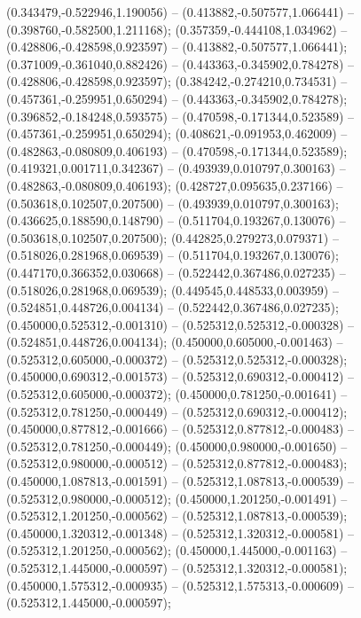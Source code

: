  (0.343479,-0.522946,1.190056) -- (0.413882,-0.507577,1.066441) -- (0.398760,-0.582500,1.211168);
 (0.357359,-0.444108,1.034962) -- (0.428806,-0.428598,0.923597) -- (0.413882,-0.507577,1.066441);
 (0.371009,-0.361040,0.882426) -- (0.443363,-0.345902,0.784278) -- (0.428806,-0.428598,0.923597);
 (0.384242,-0.274210,0.734531) -- (0.457361,-0.259951,0.650294) -- (0.443363,-0.345902,0.784278);
 (0.396852,-0.184248,0.593575) -- (0.470598,-0.171344,0.523589) -- (0.457361,-0.259951,0.650294);
 (0.408621,-0.091953,0.462009) -- (0.482863,-0.080809,0.406193) -- (0.470598,-0.171344,0.523589);
 (0.419321,0.001711,0.342367) -- (0.493939,0.010797,0.300163) -- (0.482863,-0.080809,0.406193);
 (0.428727,0.095635,0.237166) -- (0.503618,0.102507,0.207500) -- (0.493939,0.010797,0.300163);
 (0.436625,0.188590,0.148790) -- (0.511704,0.193267,0.130076) -- (0.503618,0.102507,0.207500);
 (0.442825,0.279273,0.079371) -- (0.518026,0.281968,0.069539) -- (0.511704,0.193267,0.130076);
 (0.447170,0.366352,0.030668) -- (0.522442,0.367486,0.027235) -- (0.518026,0.281968,0.069539);
 (0.449545,0.448533,0.003959) -- (0.524851,0.448726,0.004134) -- (0.522442,0.367486,0.027235);
 (0.450000,0.525312,-0.001310) -- (0.525312,0.525312,-0.000328) -- (0.524851,0.448726,0.004134);
 (0.450000,0.605000,-0.001463) -- (0.525312,0.605000,-0.000372) -- (0.525312,0.525312,-0.000328);
 (0.450000,0.690312,-0.001573) -- (0.525312,0.690312,-0.000412) -- (0.525312,0.605000,-0.000372);
 (0.450000,0.781250,-0.001641) -- (0.525312,0.781250,-0.000449) -- (0.525312,0.690312,-0.000412);
 (0.450000,0.877812,-0.001666) -- (0.525312,0.877812,-0.000483) -- (0.525312,0.781250,-0.000449);
 (0.450000,0.980000,-0.001650) -- (0.525312,0.980000,-0.000512) -- (0.525312,0.877812,-0.000483);
 (0.450000,1.087813,-0.001591) -- (0.525312,1.087813,-0.000539) -- (0.525312,0.980000,-0.000512);
 (0.450000,1.201250,-0.001491) -- (0.525312,1.201250,-0.000562) -- (0.525312,1.087813,-0.000539);
 (0.450000,1.320312,-0.001348) -- (0.525312,1.320312,-0.000581) -- (0.525312,1.201250,-0.000562);
 (0.450000,1.445000,-0.001163) -- (0.525312,1.445000,-0.000597) -- (0.525312,1.320312,-0.000581);
 (0.450000,1.575312,-0.000935) -- (0.525312,1.575313,-0.000609) -- (0.525312,1.445000,-0.000597);
